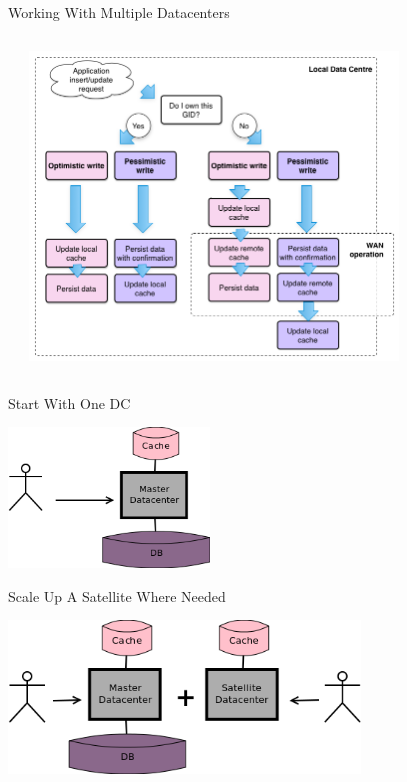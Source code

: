 \documentclass[aspectratio=169]{beamer}
\begin{document}
\begin{frame}{Working With Multiple Datacenters}
    \begin{columns}
        \begin{column}[c]{0.1\textwidth}
        \end{column}
        \begin{column}[c]{0.8\textwidth}
            \includegraphics[width=0.8\textwidth]{images/multidcops.png}
        \end{column}
        \begin{column}[c]{0.1\textwidth}
        \end{column}
    \end{columns}
\end{frame}

\begin{frame}{Start With One DC}
    \begin{center}
        \includegraphics[width=0.4\textwidth]{images/scalingdcs1.png}
    \end{center}
\end{frame}

\begin{frame}{Scale Up A Satellite Where Needed}
    \begin{center}
        \includegraphics[width=0.7\textwidth]{images/scalingdcs2.png}
    \end{center}
\end{frame}
\end{document}
